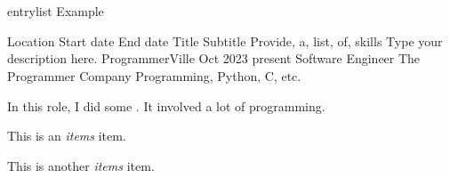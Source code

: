 \section{\faCode}{entrylist Example}
\begin{entrylist}
	\entry
	{Location}
	{Start date}
	{End date} %
	{Title}
	{Subtitle}
	{Provide, a, list, of, skills} %
	{Type your description here.}
	\entry
	{ProgrammerVille}
	{Oct 2023}
	{present} %
	{Software Engineer }
	{The Programmer Company}
	{Programming, Python, C, etc.} %
	{In this role, I did some . It involved a lot of programming.
		\begin{items}
			\item This is an \emph{items} item.
			\item This is another \emph{items} item.
		\end{items}
	}
\end{entrylist}
